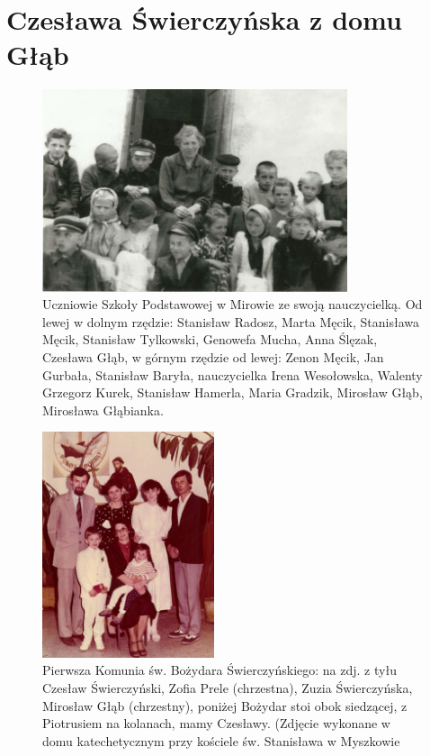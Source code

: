 \section{Czesława Świerczyńska z domu Głąb}

\begin{figure}[!h]
\begin{center}
\includegraphics[width=0.8\textwidth]{zdjecia/szkola_w_mirowie.jpg}
\caption[Uczniowie Szkoły Podstawowej w Mirowie]{Uczniowie Szkoły Podstawowej w Mirowie ze swoją nauczycielką. Od lewej w dolnym rzędzie: Stanisław Radosz, Marta Męcik, Stanisława Męcik, Stanisław Tylkowski, Genowefa Mucha, Anna Ślęzak, Czesława Głąb, w górnym rzędzie od lewej: Zenon Męcik, Jan Gurbała, Stanisław Baryła, nauczycielka Irena Wesołowska, Walenty Grzegorz Kurek, Stanisław Hamerla, Maria Gradzik, Mirosław Głąb, Mirosława Głąbianka.}
\label{rys:szkola_w_mirowie}
\end{center}
\end{figure}

\begin{figure}
\begin{center}
\includegraphics[width=0.45\textwidth, angle=270]{zdjecia/komunia_bozydara_swierczynskiego.jpg}
\caption[Pierwsza Komunia św. Bożydara Świerczyńskiego]{Pierwsza Komunia św. Bożydara Świerczyńskiego: na zdj. z tyłu Czesław Świerczyński, Zofia Prele (chrzestna), Zuzia Świerczyńska, Mirosław Głąb (chrzestny), poniżej Bożydar stoi obok siedzącej, z Piotrusiem na kolanach, mamy Czesławy. (Zdjęcie wykonane w domu katechetycznym przy kościele św. Stanisława w Myszkowie}
\label{rys:komunia_bozydara_swierczynskiego}
\end{center}
\end{figure}


